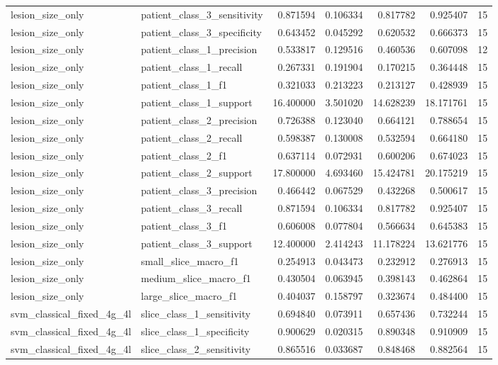 \begin{tabular}{llrrrrr}
lesion_size_only & patient_class_3_sensitivity & 0.871594 & 0.106334 & 0.817782 & 0.925407 & 15 \\
lesion_size_only & patient_class_3_specificity & 0.643452 & 0.045292 & 0.620532 & 0.666373 & 15 \\
lesion_size_only & patient_class_1_precision & 0.533817 & 0.129516 & 0.460536 & 0.607098 & 12 \\
lesion_size_only & patient_class_1_recall & 0.267331 & 0.191904 & 0.170215 & 0.364448 & 15 \\
lesion_size_only & patient_class_1_f1 & 0.321033 & 0.213223 & 0.213127 & 0.428939 & 15 \\
lesion_size_only & patient_class_1_support & 16.400000 & 3.501020 & 14.628239 & 18.171761 & 15 \\
lesion_size_only & patient_class_2_precision & 0.726388 & 0.123040 & 0.664121 & 0.788654 & 15 \\
lesion_size_only & patient_class_2_recall & 0.598387 & 0.130008 & 0.532594 & 0.664180 & 15 \\
lesion_size_only & patient_class_2_f1 & 0.637114 & 0.072931 & 0.600206 & 0.674023 & 15 \\
lesion_size_only & patient_class_2_support & 17.800000 & 4.693460 & 15.424781 & 20.175219 & 15 \\
lesion_size_only & patient_class_3_precision & 0.466442 & 0.067529 & 0.432268 & 0.500617 & 15 \\
lesion_size_only & patient_class_3_recall & 0.871594 & 0.106334 & 0.817782 & 0.925407 & 15 \\
lesion_size_only & patient_class_3_f1 & 0.606008 & 0.077804 & 0.566634 & 0.645383 & 15 \\
lesion_size_only & patient_class_3_support & 12.400000 & 2.414243 & 11.178224 & 13.621776 & 15 \\
lesion_size_only & small_slice_macro_f1 & 0.254913 & 0.043473 & 0.232912 & 0.276913 & 15 \\
lesion_size_only & medium_slice_macro_f1 & 0.430504 & 0.063945 & 0.398143 & 0.462864 & 15 \\
lesion_size_only & large_slice_macro_f1 & 0.404037 & 0.158797 & 0.323674 & 0.484400 & 15 \\
svm_classical_fixed_4g_4l & slice_class_1_sensitivity & 0.694840 & 0.073911 & 0.657436 & 0.732244 & 15 \\
svm_classical_fixed_4g_4l & slice_class_1_specificity & 0.900629 & 0.020315 & 0.890348 & 0.910909 & 15 \\
svm_classical_fixed_4g_4l & slice_class_2_sensitivity & 0.865516 & 0.033687 & 0.848468 & 0.882564 & 15 \\

\end{tabular}
